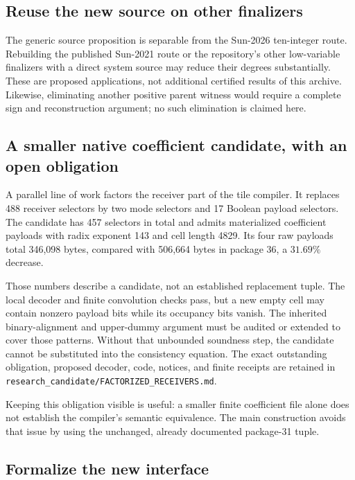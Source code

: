 \documentclass[11pt]{article}
\newcommand{\file}[1]{\nolinkurl{#1}}
\theoremstyle{definition}
\theoremstyle{remark}
\numberwithin{equation}{section}
\begin{document}
\subsection{Reuse the new source on other finalizers}

The generic source proposition is separable from the Sun-2026
ten-integer route. Rebuilding the published Sun-2021 route or the
repository's other low-variable finalizers with a direct system source
may reduce their degrees substantially. These are proposed applications,
not additional certified results of this archive. Likewise, eliminating
another positive parent witness would require a complete sign and
reconstruction argument; no such elimination is claimed here.

\subsection{A smaller native coefficient candidate, with an open obligation}

A parallel line of work factors the receiver part of the tile compiler.
It replaces 488 receiver selectors by two mode selectors and 17 Boolean
payload selectors. The candidate has 457 selectors in total and admits
materialized coefficient payloads with radix exponent 143 and cell
length 4829. Its four raw payloads total 346,098 bytes, compared with
506,664 bytes in package 36, a \(31.69\%\) decrease.

Those numbers describe a candidate, not an established replacement tuple.
The local decoder and finite convolution checks pass, but a new empty
cell may contain nonzero payload bits while its occupancy bits vanish.
The inherited binary-alignment and upper-dummy argument must be audited
or extended to cover those patterns. Without that unbounded soundness
step, the candidate cannot be substituted into the consistency equation.
The exact outstanding obligation, proposed decoder, code, notices, and
finite receipts are retained in
\file{research_candidate/FACTORIZED_RECEIVERS.md}.

Keeping this obligation visible is useful: a smaller finite coefficient
file alone does not establish the compiler's semantic equivalence.
The main construction avoids that issue by using the unchanged,
already documented package-31 tuple.

\subsection{Formalize the new interface}
\end{document}
